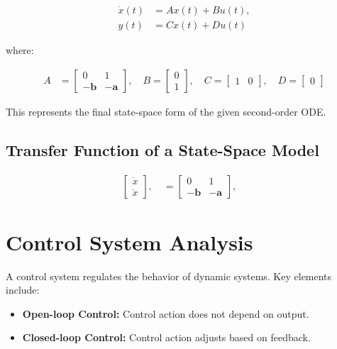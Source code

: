 \documentclass{article}
\begin{document}
\begin{align*}
    \dot{x}(t) &= A x(t) + B u(t), \\
    y(t) &= C x(t) + D u(t)
\end{align*}

where:

\begin{align*}
    A &= \begin{bmatrix} 0 & 1 \\ -\mathbf{b} & -\mathbf{a} \end{bmatrix}, \quad
    B = \begin{bmatrix} 0 \\ 1 \end{bmatrix}, \quad
    C = \begin{bmatrix} 1 & 0 \end{bmatrix}, \quad
    D = \begin{bmatrix} 0 \end{bmatrix}
\end{align*}

This represents the final state-space form of the given second-order ODE.

\subsection{Transfer Function of a State-Space Model}
\begin{align*}
      \begin{bmatrix} \dot{x} \\ \dot{x} \end{bmatrix}, \quad = \begin{bmatrix} 0 & 1 \\ -\mathbf{b} & -\mathbf{a} \end{bmatrix}, \quad
  \end{align*}




\section{Control System Analysis}
A control system regulates the behavior of dynamic systems. Key elements
include:
\begin{itemize}
      \item \textbf{Open-loop Control:} Control action does not depend on output.
      \item \textbf{Closed-loop Control:} Control action adjusts based on feedback.
\end{itemize}
\end{document}
